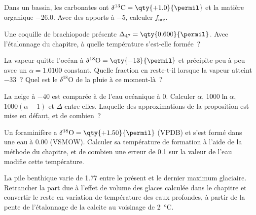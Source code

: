 \begin{exercise}[$\star$]\label{exo:b3:stable-isotopes:3}
Dans un bassin, les carbonates ont $\delta^{13}\mathrm C = \qty{+1.0}{\permil}$ et la
matière organique \qty{-26.0}{\permil}. Avec des apports à \qty{-5}{\permil}, calculer
$f_{\mathrm{org}}$.
\end{exercise}

\begin{exercise}[$\star$]\label{exo:b3:stable-isotopes:4}
Une coquille de brachiopode présente $\Delta_{47} = \qty{0.600}{\permil}$. Avec l'étalonnage
du chapitre, à quelle température s'est-elle formée~?
\end{exercise}

\begin{exercise}[$\star\star$]\label{exo:b3:stable-isotopes:5}
La vapeur quitte l'océan à $\delta^{18}\mathrm O = \qty{-13}{\permil}$ et précipite
peu à peu avec un $\alpha = 1.0100$ constant. Quelle fraction en reste-t-il lorsque la
vapeur atteint \qty{-33}{\permil}~? Quel est le $\delta^{18}\mathrm O$ de la pluie
à ce moment-là~?
\end{exercise}

\begin{exercise}[$\star\star$]\label{exo:b3:stable-isotopes:6}
La neige à \qty{-40}{\permil} est comparée à de l'eau océanique à 0. Calculer $\alpha$,
$1000\ln\alpha$, $1000(\alpha - 1)$ et $\Delta$ entre elles. Laquelle des
approximations de la proposition est mise en défaut, et de combien~?
\end{exercise}

\begin{exercise}[$\star\star$]\label{exo:b3:stable-isotopes:7}
Un foraminifère a $\delta^{18}\mathrm O = \qty{+1.50}{\permil}$ (VPDB) et s'est formé dans
une eau à \qty{0.00}{\permil} (VSMOW). Calculer sa température de formation à l'aide de la
méthode du chapitre, et de combien une erreur de \qty{0.1}{\permil} sur la valeur de
l'eau modifie cette température.
\end{exercise}

\begin{exercise}[$\star\star$]\label{exo:b3:stable-isotopes:8}
La pile benthique varie de \qty{1.77}{\permil} entre le présent et le dernier
maximum glaciaire. Retrancher la part due à l'effet de volume des glaces calculée dans le chapitre et
convertir le reste en variation de température des eaux profondes, à partir de la pente de
l'étalonnage de la calcite au voisinage de \qty{2}{\celsius}.
\end{exercise}

